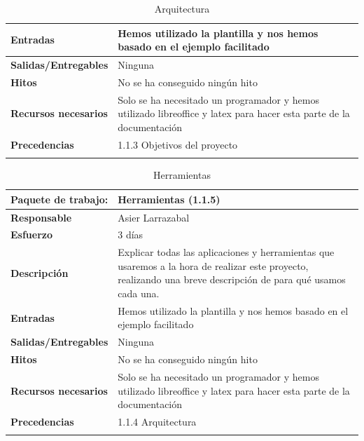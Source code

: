 \documentclass{report}
\begin{document}
\begin{center}
\begin{longtable}{|p{6cm}|p{6cm}|}
                    \hline
                    \textbf{Entradas} & Hemos utilizado la plantilla y nos hemos basado en el ejemplo facilitado\\
                    \hline
                    \textbf{Salidas/Entregables} & Ninguna\\
                    \hline
                    \textbf{Hitos} & No se ha conseguido ningún hito\\
                    \hline
                    \textbf{Recursos necesarios} & Solo se ha necesitado un programador y hemos utilizado libreoffice y latex para hacer esta parte de la documentación\\
                    \hline
                    \textbf{Precedencias} & 1.1.3 Objetivos del proyecto\\
                    \hline
                    \caption{Arquitectura}
                \end{longtable}
                \clearpage
                \begin{longtable}{|p{6cm}|p{6cm}|}
                    \hline
                    \textbf{Paquete de trabajo:} & Herramientas (1.1.5)\\
                    \hline
                    \textbf{Responsable} & Asier Larrazabal\\
                    \hline
                    \textbf{Esfuerzo} & 3 días\\
                    \hline
                    \textbf{Descripción} & Explicar todas las aplicaciones y herramientas que usaremos a la hora de realizar este proyecto, realizando una breve descripción de para qué usamos cada una.\\
                    \hline
                    \textbf{Entradas} & Hemos utilizado la plantilla y nos hemos basado en el ejemplo facilitado\\
                    \hline
                    \textbf{Salidas/Entregables} & Ninguna\\
                    \hline
                    \textbf{Hitos} & No se ha conseguido ningún hito\\
                    \hline
                    \textbf{Recursos necesarios} & Solo se ha necesitado un programador y hemos utilizado libreoffice y latex para hacer esta parte de la documentación\\
                    \hline
                    \textbf{Precedencias} & 1.1.4 Arquitectura\\
                    \hline
                    \caption{Herramientas}

\end{longtable}
\end{center}
\end{document}
